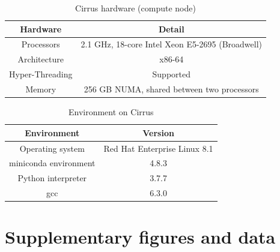 \begin{table}[ht]
    \centering
    \begin{tabular}{|c c|}
        \hline
        Hardware        & Detail                                          \\ [0.5ex]
        \hline\hline
        Processors      & 2.1 GHz, 18-core Intel Xeon E5-2695 (Broadwell) \\
        Architecture    & x86-64                                          \\
        Hyper-Threading & Supported                                       \\
        Memory          & 256 GB NUMA, shared between two processors         \\
        \hline
    \end{tabular}
    \caption{Cirrus hardware (compute node)}
    \label{table:remote_hardware}
\end{table}

\begin{table}[h]
    \centering
    \begin{tabular}{|c c|}
        \hline
        Environment           & Version                      \\ [0.5ex]
        \hline\hline
        Operating system      & Red Hat Enterprise Linux 8.1 \\
        miniconda environment & 4.8.3                        \\
        Python interpreter    & 3.7.7                        \\
        gcc                   & 6.3.0                        \\
        \hline
    \end{tabular}
    \caption{Environment on Cirrus}
    \label{table:cirrus_soft}
\end{table}


\chapter{Supplementary figures and data}







